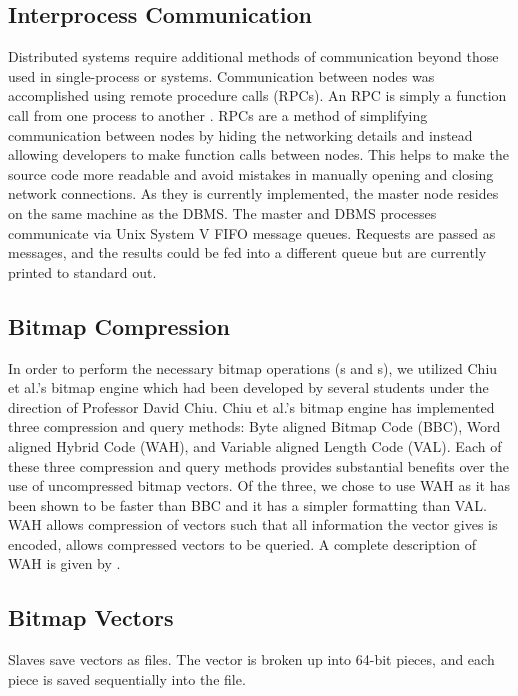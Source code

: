 %
\subsection{Interprocess Communication}
Distributed systems require additional methods of communication beyond those
used in single-process or systems. Communication between nodes
was accomplished using remote procedure calls (RPCs). An RPC is simply a
function call from one process to another \cite{tanenbaum1994}. RPCs are a
method of simplifying communication between nodes by hiding the networking
details and instead allowing developers to make function calls between nodes.
This helps to make the source code more readable and avoid mistakes in manually
opening and closing network connections. As they is currently implemented, the master node
resides on the same machine as the DBMS. The master and DBMS processes
communicate via Unix System V FIFO message queues. Requests are passed
as messages, and the results could be fed into a different queue but are
currently printed to standard out.
%
\subsection{Bitmap Compression}
In order to perform the necessary bitmap operations (s and
s), we utilized Chiu et al.'s bitmap engine which had been developed
by several students under the direction of Professor David Chiu. Chiu et al.'s
bitmap engine has implemented three compression and query methods: Byte aligned
Bitmap Code (BBC), Word aligned Hybrid Code (WAH), and Variable aligned Length
Code (VAL). Each of these three compression and query methods provides
substantial benefits over the use of uncompressed bitmap vectors. Of the three,
we chose to use WAH as it has been shown to be faster than BBC and it has a
simpler formatting than VAL. WAH allows compression of vectors such that all
information the vector gives is encoded, allows compressed vectors to be
queried. A complete description of WAH is given by \cite{wu2001}.
\subsection{Bitmap Vectors}
Slaves save vectors as files. The vector is broken up into 64-bit pieces, and
each piece is saved sequentially into the file.
%
